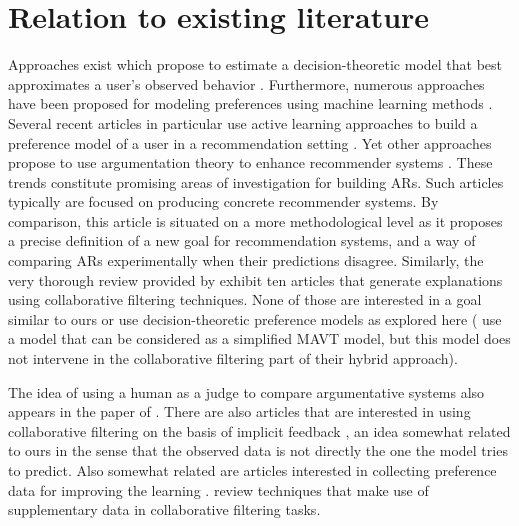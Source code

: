 \documentclass[version=3.21, pagesize, twoside=off, bibliography=totoc, DIV=calc, fontsize=12pt, a4paper, french, english]{scrartcl}
\begin{document}
\section{Relation to existing literature}
\label{sec:litt}
Approaches exist which propose to estimate a decision-theoretic model that best approximates a user’s observed behavior \citep{greco_trends_2010, sobrie_learning_2018}. 
Furthermore, numerous approaches have been proposed for modeling preferences using machine learning methods \citep{furnkranz_preference_2010}. 
Several recent articles in particular use active learning approaches to build a preference model of a user in a recommendation setting \citep{teso_constructive_2016, teso_coactive_2017, dragone_constructive_2018, erculiani_automating_2018, dragone_no_2018}.
Yet other approaches propose to use argumentation theory \citep{besnard_elements_2008} to enhance recommender systems \citep{chesnevar_empowering_2009, rago_argumentation-based_2018}. These trends constitute promising areas of investigation for building \acp{AR}. Such articles typically are focused on producing concrete recommender systems. By comparison, this article is situated on a more methodological level as it proposes a precise definition of a new goal for recommendation systems, and a way of comparing \acp{AR} experimentally when their predictions disagree. Similarly, the very thorough review provided by \citet{nunes_systematic_2017} exhibit ten articles that generate explanations using collaborative filtering techniques. None of those are interested in a goal similar to ours or use decision-theoretic preference models as explored here (\citet{marx_increasing_2010} use a model that can be considered as a simplified MAVT model, but this model does not intervene in the collaborative filtering part of their hybrid approach).

The idea of using a human as a judge to compare argumentative systems also appears in the paper of \citet{irving_ai_2018}.
There are also articles that are interested in using collaborative filtering on the basis of implicit feedback \citep{rendle_bpr:_2009, hu_collaborative_2008}, an idea somewhat related to ours in the sense that the observed data is not directly the one the model tries to predict.
Also somewhat related are articles interested in collecting preference data for improving the learning \citep{sepliarskaia_preference_2018}. \citet{chen_attribute-aware_2018} review techniques that make use of supplementary data in collaborative filtering tasks.
\end{document}
